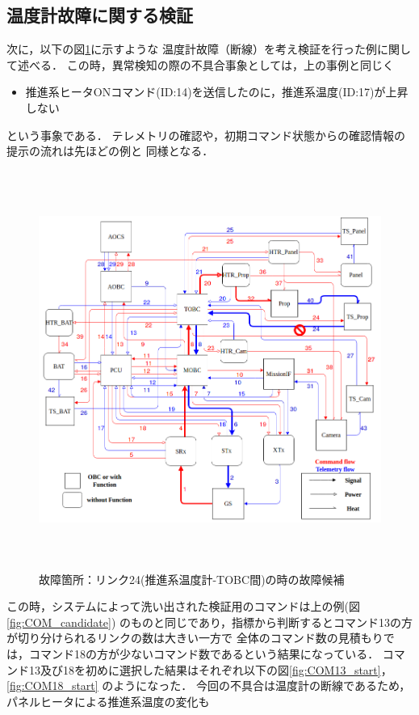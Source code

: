 \documentclass[11pt]{jsreport}
\begin{document}
\subsection{温度計故障に関する検証}%
次に，以下の図\ref{fig:fault_mode2}に示すような
温度計故障（断線）を考え検証を行った例に関して述べる．
この時，異常検知の際の不具合事象としては，上の事例と同じく
\begin{itemize}
   \item 推進系ヒータONコマンド(ID:14)を送信したのに，推進系温度(ID:17)が上昇しない
\end{itemize}
という事象である．
テレメトリの確認や，初期コマンド状態からの確認情報の提示の流れは先ほどの例と
同様となる．
\begin{figure}[H]
   \centering
      \includegraphics[height=13.0cm]{figure/fault_mode2.png}
      \caption{故障箇所：リンク24(推進系温度計-TOBC間)の時の故障候補}
      \label{fig:fault_mode2}
\end{figure}
この時，システムによって洗い出された検証用のコマンドは上の例(図\ref{fig:COM_candidate})
のものと同じであり，指標から判断するとコマンド13の方が切り分けられるリンクの数は大きい一方で
全体のコマンド数の見積もりでは，コマンド18の方が少ないコマンド数であるという結果になっている．
コマンド13及び18を初めに選択した結果はそれぞれ以下の図\ref{fig:COM13_start}，\ref{fig:COM18_start}
のようになった．
今回の不具合は温度計の断線であるため，パネルヒータによる推進系温度の変化も
\end{document}
